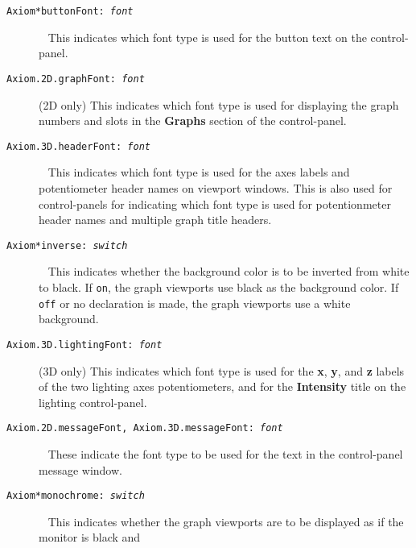 %
\begin{description}
%
\item[{\tt Axiom*buttonFont:\ \it font}] \ \newline
This indicates which
font type is used for the button text on the control-panel.
%
\item[{\tt Axiom.2D.graphFont:\ \it font}] \quad (2D only) \newline
This indicates
which font type is used for displaying the graph numbers and
slots in the {\bf Graphs} section of the \twodim{} control-panel.
%
\item[{\tt Axiom.3D.headerFont:\ \it font}] \ \newline
This indicates which
font type is used for the axes labels and potentiometer
header names on \threedim{} viewport windows.
This is also used for \twodim{} control-panels for indicating
which font type is used for potentionmeter header names and
multiple graph title headers.
%
\item[{\tt Axiom*inverse:\ \it switch}] \ \newline
This indicates whether the
background color is to be inverted from white to black.
If {\tt on}, the graph viewports use black as the background
color.
If {\tt off} or no declaration is made, the graph viewports use a
white background.
%
\item[{\tt Axiom.3D.lightingFont:\ \it font}] \quad (3D only) \newline
This indicates which font type is used for the {\bf x},
{\bf y}, and {\bf z} labels of the two lighting axes potentiometers, and for
the {\bf Intensity} title on the lighting control-panel.
%
\item[{\tt Axiom.2D.messageFont, Axiom.3D.messageFont:\ \it font}] \ \newline
These indicate the font type
to be used for the text in the control-panel message window.
%
\item[{\tt Axiom*monochrome:\ \it switch}] \ \newline
This indicates whether the
graph viewports are to be displayed as if the monitor is black and

\end{description}
